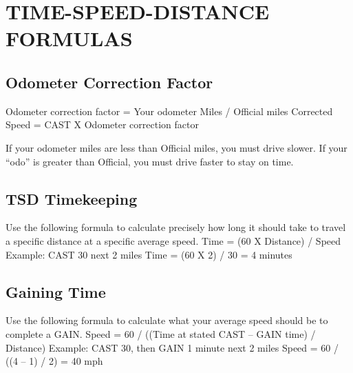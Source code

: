 \section{TIME-SPEED-DISTANCE FORMULAS}
\subsection{Odometer Correction Factor}
\indent Odometer correction factor = Your odometer Miles / Official miles
\indent Corrected Speed = CAST X Odometer correction factor

If your odometer miles are less than Official miles, you must drive slower. If your “odo” is greater than Official, you must drive faster to stay on time.

\subsection{TSD Timekeeping}
Use the following formula to calculate precisely how long it should
take to travel a specific distance at a specific average speed.
\indent Time = (60 X Distance) / Speed
\indent Example: CAST 30 next 2 miles
\indent Time = (60 X 2) / 30 = 4 minutes

\subsection{Gaining Time}
Use the following formula to calculate what your average speed
should be to complete a GAIN.
\indent Speed = 60 / ((Time at stated CAST – GAIN time) / Distance)
\indent Example: CAST 30, then GAIN 1 minute next 2 miles
\indent Speed = 60 / ((4 – 1) / 2) = 40 mph

